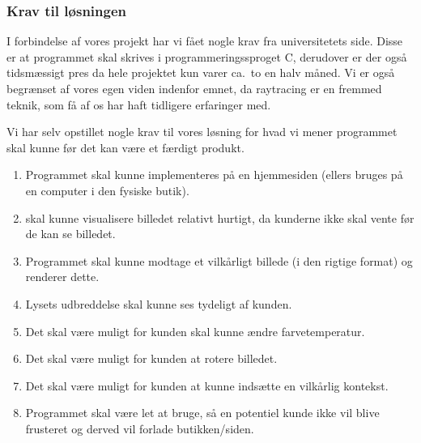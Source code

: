 \subsubsection{Krav til løsningen}

I forbindelse af vores projekt har vi fået nogle krav fra universitetets side. Disse er at programmet skal skrives i programmeringssproget C, derudover er der også tidsmæssigt pres da hele projektet kun varer ca.\ to en halv måned. 
Vi er også begrænset af vores egen viden indenfor emnet, da raytracing er en fremmed teknik, som få af os har haft tidligere erfaringer med. 

Vi har selv opstillet nogle krav til vores løsning for hvad vi mener programmet skal kunne før det kan være et færdigt produkt.
\begin{enumerate}
    \item Programmet skal kunne implementeres på en hjemmesiden (ellers bruges på en computer i den fysiske butik).
    \item skal kunne visualisere billedet relativt hurtigt, da kunderne ikke skal vente før de kan se billedet.
    \item Programmet skal kunne modtage et vilkårligt billede (i den rigtige format) og renderer dette.
    \item Lysets udbreddelse skal kunne ses tydeligt af kunden.
    \item Det skal være muligt for kunden skal kunne ændre farvetemperatur.
    \item Det skal være muligt for kunden at rotere billedet.
    \item Det skal være muligt for kunden at kunne indsætte en vilkårlig kontekst.
    \item Programmet skal være let at bruge, så en potentiel kunde ikke vil blive frusteret og derved vil forlade butikken/siden.
\end{enumerate}